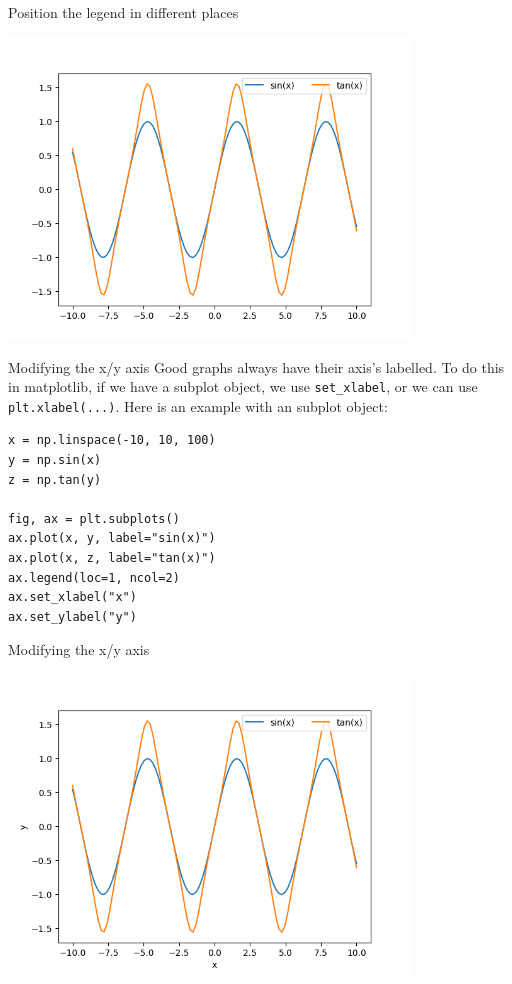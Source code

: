 \documentclass[10pt]{beamer}
\begin{document}
\begin{frame}[label={sec:org5f5eae2}]{Position the legend in different places}
\begin{center}
\includegraphics[width=0.8\textwidth]{images/legend-2.png}
\end{center}
\end{frame}

\begin{frame}[label={sec:orgf073868},fragile]{Modifying the x/y axis}
 Good graphs always have their axis's labelled. To do this in matplotlib, if we
have a subplot object, we use \texttt{set\_xlabel}, or we can use \texttt{plt.xlabel(...)}. Here is
an example with an subplot object:

\begin{verbatim}
x = np.linspace(-10, 10, 100)
y = np.sin(x)
z = np.tan(y)

fig, ax = plt.subplots()
ax.plot(x, y, label="sin(x)")
ax.plot(x, z, label="tan(x)")
ax.legend(loc=1, ncol=2)
ax.set_xlabel("x")
ax.set_ylabel("y")
\end{verbatim}
\end{frame}

\begin{frame}[label={sec:org093ab5c}]{Modifying the x/y axis}
\begin{center}
\includegraphics[width=0.8\textwidth]{images/axis.png}
\end{center}
\end{frame}
\end{document}
